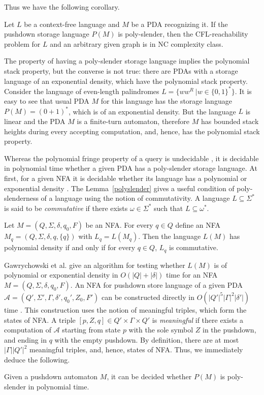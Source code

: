Thus we have the following corollary.
\begin{corollary}
Let $L$ be a context-free language and $M$ be a PDA recognizing it. If the pushdown storage language $P(M)$ is poly-slender, then the CFL-reachability problem for $L$ and an arbitrary given graph is in NC complexity class.
\end{corollary}
The property of having a poly-slender storage language implies the polynomial stack property, but the converse is not true: there are PDAs with a storage language of an exponential density, which have the polynomial stack property. Consider the language of even-length palindromes $L = \{ ww^R \ | w \in {\{0, 1\}}^*\}$. It is easy to see that usual PDA $M$ for this language has the storage language $P(M) = {(0 + 1)}^*$, which is of an exponential density. But the language $L$ is linear and  the PDA $M$ is a finite-turn automaton, therefore $M$ has bounded stack heights during every accepting computation, and, hence, has the polynomial stack property. 


Whereas the polynomial fringe property of a query is undecidable \cite{Ullman}, it is decidable in polynomial time whether a given PDA has a poly-slender storage language. At first, for a given NFA it is decidable whether its language has a polynomial or exponential density \cite*{sparseness, poldens} . The Lemma~\ref{polyslender} gives a useful condition of poly-slenderness of a language using the notion of commutativity. A language $L \subseteq \Sigma^*$ is said to be \textit{commutative} if there exists $\omega \in \Sigma^*$  such that $L \subseteq \omega^*$.
\begin{lemma}
\label{polyslender}
Let $M = (Q,\Sigma,\delta ,q_{0},F)$ be an NFA. For every $q \in Q$ define an NFA $M_q = (Q,\Sigma,\delta,q, \{q\})$ with $L_q = L(M_q )$. Then the language $L(M)$ has polynomial density if and only if for every $q \in Q$, $L_q$ is commutative.
\end{lemma}

Gawrychowski et al. \cite{Gawrychowski} give an algorithm for testing whether $L(M)$ is of polynomial or exponential density in $O(|Q| + |\delta|)$ time for an NFA $M = (Q,\Sigma,\delta ,q_{0},F)$. An NFA for pushdown store language of a given PDA $\mathcal{A} = (Q', \Sigma', \Gamma, \delta', q_0', Z_0, F')$ can be constructed directly in $O({|Q'|}^5{|\Gamma|}^2|\delta'|)$ time \cite{Malcher}. This construction uses the notion of meaningful triples, which form the states of NFA. A triple $[p, Z, q] \in Q' \times \Gamma \times Q'$ is \textit{meaningful} if there exists a computation of $\mathcal{A}$ starting from state $p$ with the sole symbol $Z$ in the pushdown, and ending in $q$ with the empty pushdown. By definition, there are at most $|\Gamma|{|Q'|}^2$ meaningful triples, and, hence, states of NFA. Thus, we immediately deduce the following.
\begin{corollary}
Given a pushdown automaton $M$, it can be decided whether $P(M)$ is poly-slender in polynomial time.
\end{corollary}

